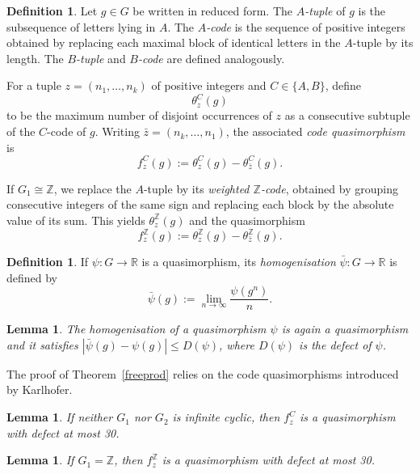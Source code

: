 \documentclass[12pt]{amsart}
\newtheorem{lemma}[theorem]{Lemma}
\theoremstyle{definition}
\newtheorem{definition}[theorem]{Definition}
\theoremstyle{remark}
\numberwithin{equation}{subsection}
\theoremstyle{plain}
\numberwithin{equation}{section}
\begin{document}
\begin{definition}
Let $g \in G$ be written in reduced form.  
The \emph{$A$-tuple} of $g$ is the subsequence of letters lying in $A$.  
The \emph{$A$-code} is the sequence of positive integers obtained by replacing each maximal block of identical letters in the $A$-tuple by its length.  
The \emph{$B$-tuple} and \emph{$B$-code} are defined analogously.
\end{definition}


For a tuple $z = (n_1,\dots,n_k)$ of positive integers and $C \in \{A,B\}$, define  
\[
\theta_z^C(g)
\]
to be the maximum number of disjoint occurrences of $z$ as a consecutive subtuple of the $C$-code of $g$.  
Writing $\bar z = (n_k,\dots,n_1)$, the associated \emph{code quasimorphism} is
\[
f_z^C(g) := \theta_z^C(g) - \theta_{\bar z}^C(g).
\]

If $G_1 \cong \mathbb{Z}$, we replace the $A$-tuple by its \emph{weighted $\mathbb{Z}$-code}, obtained by grouping consecutive integers of the same sign and replacing each block by the absolute value of its sum.  
This yields $\theta_z^{\mathbb{Z}}(g)$ and the quasimorphism
\[
f_z^{\mathbb{Z}}(g) := \theta_z^{\mathbb{Z}}(g) - \theta_{\bar z}^{\mathbb{Z}}(g).
\]

\begin{definition}
    
If $\psi\colon G \to \mathbb{R}$ is a quasimorphism, its
\emph{homogenisation} $\bar{\psi} : G \to \mathbb{R}$ is defined by
\[
\bar{\psi}(g) := \lim_{n \to \infty} \frac{\psi(g^n)}{n}.
\]
\end{definition}

\begin{lemma}\cite[Lemma~2.4]{KB}\label{homo}
    The homogenisation of a quasimorphism $\psi$ is again a  quasimorphism and it satisfies $|\bar{\psi}(g)-\psi(g)| \leq D(\psi)$, where $D(\psi)$ is the defect of $\psi$.
\end{lemma}


The proof of Theorem~\ref{freeprod} relies on the code quasimorphisms introduced by Karlhofer.


\begin{lemma}\cite[Lemma 4.8]{KB}
If neither $ G_1 $ nor $ G_2 $ is infinite cyclic, then $ f_z^C $ is a quasimorphism with defect at most 30.
\end{lemma}

\begin{lemma}\cite[Lemma 5.5]{KB} 
If $ G_1 = \mathbb{Z} $, then $ f_z^{\mathbb{Z}} $ is a quasimorphism with defect at most 30.
\end{lemma}
\end{document}
